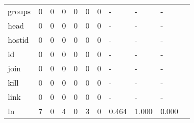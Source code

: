 \begin{longtable}{lp{1.10cm}p{1.10cm}p{1.10cm}p{1.10cm}p{1.10cm}p{1.10cm}p{1.10cm}p{1.10cm}p{1.10cm}p{1.10cm}}
groups    &                      0 &                                  0 &                                 0 &                                0 &                                 0 &                               0 &                              - &                                     - &                                   - \\
head      &                      0 &                                  0 &                                 0 &                                0 &                                 0 &                               0 &                              - &                                     - &                                   - \\
hostid    &                      0 &                                  0 &                                 0 &                                0 &                                 0 &                               0 &                              - &                                     - &                                   - \\
id        &                      0 &                                  0 &                                 0 &                                0 &                                 0 &                               0 &                              - &                                     - &                                   - \\
join      &                      0 &                                  0 &                                 0 &                                0 &                                 0 &                               0 &                              - &                                     - &                                   - \\
kill      &                      0 &                                  0 &                                 0 &                                0 &                                 0 &                               0 &                              - &                                     - &                                   - \\
link      &                      0 &                                  0 &                                 0 &                                0 &                                 0 &                               0 &                              - &                                     - &                                   - \\
ln        &                      7 &                                  0 &                                 4 &                                0 &                                 3 &                               0 &                          0.464 &                                 1.000 &                               0.000 \\

\end{longtable}
